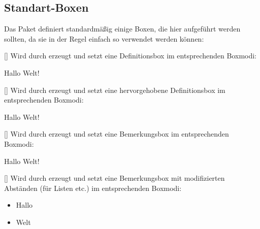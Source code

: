\subsection{Standart-Boxen}
Das Paket  definiert standardmäßig einige Boxen, die hier aufgeführt werden sollten, da sie in der Regel einfach so verwendet werden können:

%
%
%

[]
Wird durch  erzeugt und setzt eine Definitionsbox im entsprechenden Boxmodi:
\begin{latex}
\begin{definition}[Hallo]
   Hallo Welt!
\end{definition}
\end{latex} 

%
%
%

[]
Wird durch  erzeugt und setzt eine hervorgehobene Definitionsbox im entsprechenden Boxmodi:
\begin{latex}
\begin{definition*}[Hallo]
   Hallo Welt!
\end{definition*}
\end{latex}

%
%
%

[]
Wird durch  erzeugt und setzt eine Bemerkungsbox im entsprechenden Boxmodi:
\begin{latex}
\begin{bemerkung}[Hallo]
   Hallo Welt!
\end{bemerkung}
\end{latex} 

%
%
%

[]
Wird durch  erzeugt und setzt eine Bemerkungsbox mit modifizierten Abständen (für Listen etc.) im entsprechenden Boxmodi:
\begin{latex}
\begin{bemerkung*}[Hallo]
   \begin{itemize}
       \item Hallo
       \item Welt
   \end{itemize}
\end{bemerkung*}
\end{latex}

